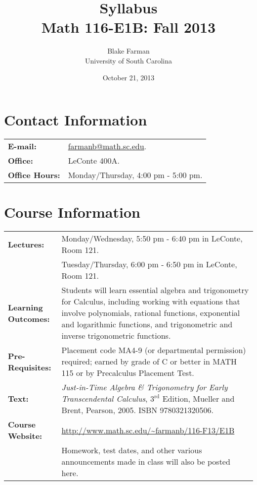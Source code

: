 \documentclass[10pt]{amsart}
\author{Blake Farman\\University of South Carolina}
\title{Syllabus\\Math 116-E1B: Fall 2013}
\date{October 21, 2013}
\begin{document}
\maketitle

\section*{Contact Information}
\noindent
\begin{tabular}{p{1.4in}p{5in}}
  {\bf E-mail:} &\href{mailto:farmanb@math.sc.edu}{farmanb@math.sc.edu}.\\
  {\bf Office:} & LeConte 400A.\\
  {\bf Office Hours:} & Monday/Thursday, 4:00 pm - 5:00 pm.\\
\end{tabular}

\section*{Course Information}
\noindent
\begin{tabular}{p{1.4in}p{5in}}
  {\bf Lectures:} &
  Monday/Wednesday,  5:50 pm - 6:40 pm in LeConte, Room 121.\\
  &Tuesday/Thursday, 6:00 pm - 6:50 pm in LeConte, Room 121.\\
  {\bf Learning Outcomes:} & Students will learn essential algebra and trigonometry for Calculus, including working with equations that 
  involve polynomials, rational functions, exponential and logarithmic functions, and trigonometric and inverse trigonometric functions.\\
  {\bf Pre-Requisites:} & Placement code MA4-9 (or departmental permission) required; earned by grade of C or better in MATH 115 or by Precalculus Placement Test.\\
  {\bf Text:} & {\it Just-in-Time Algebra \& Trigonometry for Early Transcendental Calculus}, $3^\text{rd}$ Edition, Mueller and Brent, Pearson, 2005.  ISBN 9780321320506.\\
  {\bf Course Website:} & \url{http://www.math.sc.edu/~farmanb/116-F13/E1B}\\
  & Homework, test dates, and other various announcements made in class will also be posted here.\\
\end{tabular}
\end{document}
